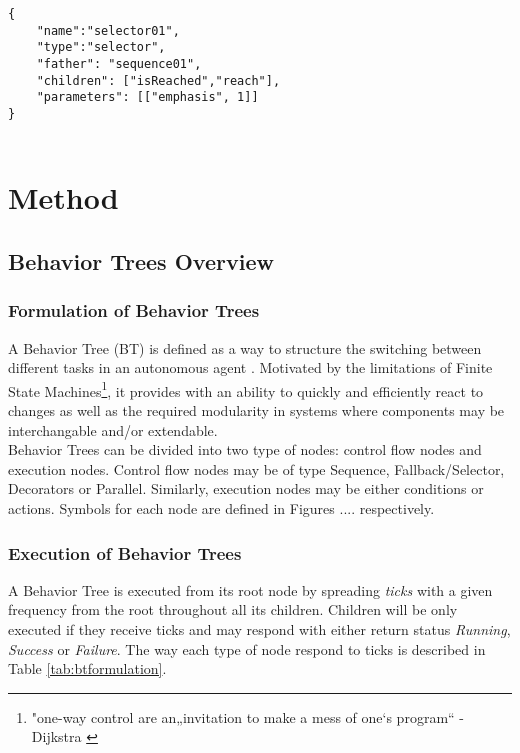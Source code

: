 \documentclass[letterpaper, 10 pt, conference]{ieeeconf}  %
\begin{document}
 \begin{verbatim}
{
    "name":"selector01",
    "type":"selector",
    "father": "sequence01",
    "children": ["isReached","reach"],
    "parameters": [["emphasis", 1]]
}


\end{verbatim}

\section{Method}


\subsection{Behavior Trees Overview}


\subsubsection{Formulation of Behavior Trees}
A Behavior Tree (BT) is defined as a way to structure the switching between different tasks in an autonomous agent \cite{c1}. Motivated by the limitations of Finite State Machines\footnote{"one-way control are an„invitation to make a mess of one‘s program“ - Dijkstra \cite{c2}}, it provides with an ability to quickly and efficiently react to changes as well as the required modularity in systems where components may be interchangable and/or extendable.\\
Behavior Trees can be divided into two type of nodes: control flow nodes and execution nodes. Control flow nodes may be of type Sequence, Fallback/Selector, Decorators or Parallel. Similarly, execution nodes may be either conditions or actions. Symbols for each node are defined in Figures .... respectively.

\subsubsection{Execution of Behavior Trees}
A Behavior Tree is executed from its root node by spreading \textit{ticks} with a given frequency from the root throughout all its children. Children will be only executed if they receive ticks and may respond with either return status \textit{Running}, \textit{Success} or \textit{Failure}. The way each type of node respond to ticks is described in Table \ref{tab:btformulation}.\\

\end{document}
